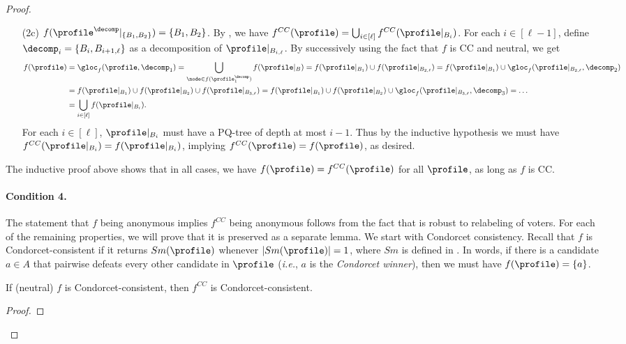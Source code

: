 \begin{proof}
\begin{enumerate}
\begin{enumerate}
        \item[(2c)] $f(\profile^\decomp|_{\{B_1,B_2\}})=\{B_1, B_2\}$. By , we have $f^{CC}(\profile)=\bigcup_{i \in [\ell]}f^{CC}(\profile|_{B_i})$. For each $i \in [\ell-1]$, define $\decomp_i= \{B_i, B_{i+1,\ell}\}$ as a decomposition of $\profile|_{B_{i,\ell}}$. By successively using the fact that $f$ is CC and neutral, we get
        \begin{align*}
            f(\profile)&=\gloc_f(\profile,\decomp_1)= \bigcup_{\node \in f(\profile^\decomp_{1})} f(\profile|_B)= f(\profile|_{B_1}) \cup f(\profile|_{B_{2,\ell}}) =  f(\profile|_{B_1}) \cup \gloc_f(\profile|_{B_{2,\ell}}, \decomp_2)\\
            &= f(\profile|_{B_1}) \cup  f(\profile|_{B_2}) \cup  f(\profile|_{B_{3,\ell}}) = f(\profile|_{B_1}) \cup  f(\profile|_{B_2}) \cup  \gloc_f(\profile|_{B_{3,\ell}}, \decomp_3)=\ldots\\
            &= \bigcup_{i \in [\ell]} f(\profile|_{B_i}).
        \end{align*}
        For each $i\in [\ell]$, $\profile|_{B_i}$ must have a PQ-tree of depth at most $i-1$. Thus by the inductive hypothesis we must have $f^{CC}(\profile|_{B_i})= f(\profile|_{B_i})$, implying $f^{CC}(\profile)=f(\profile)$, as desired. 
    \end{enumerate}
\end{enumerate}
The inductive proof above shows that in all cases, we have $f(\profile)=f^{CC}(\profile)$ for all $\profile$, as long as $f$ is CC. 


\paragraph{Condition 4.} The statement that $f$ being anonymous implies $f^{CC}$ being anonymous follows from the fact that  is robust to relabeling of voters. For each of the remaining properties, we will prove that it is preserved as a separate lemma. We start with Condorcet consistency. Recall that $f$ is Condorcet-consistent if it returns $Sm(\profile)$ whenever  $|Sm(\profile)|=1$, where $Sm$ is defined in . In words, if there is a candidate $a \in A$ that pairwise defeats every other candidate in $\profile$ (\emph{i.e.}, $a$ is the \emph{Condorcet winner}), then we must have $f(\profile)=\{a\}$.
\begin{lemma}\label{lemma:cc_condorcet}
If (neutral) $f$ is Condorcet-consistent, then $f^{CC}$ is Condorcet-consistent.
\end{lemma}
\begin{proof}


\end{proof}
\end{proof}
